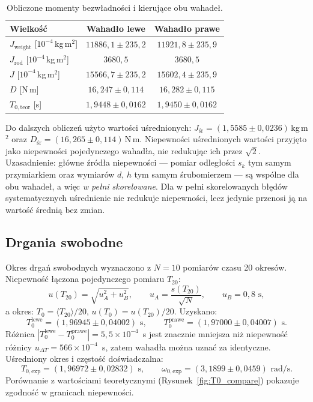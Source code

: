 \documentclass[12pt, a4paper]{article}
\begin{document}
\begin{table}[H]
    \centering
    \caption{Obliczone momenty bezwładności i kierujące obu wahadeł.}\label{tab:JD}
    \begin{tabular}{lcc}
        \toprule
        Wielkość & Wahadło lewe & Wahadło prawe \\
        \midrule
        $J_\text{weight}$ [$10^{-4}$\,kg\,m$^2$]
            & $11886{,}1\pm235{,}2$ & $11921{,}8\pm235{,}9$ \\
        $J_\text{rod}$ [$10^{-4}$\,kg\,m$^2$]
            & $3680{,}5$ & $3680{,}5$ \\
        $J$ [$10^{-4}$\,kg\,m$^2$]
            & $15566{,}7\pm235{,}2$ & $15602{,}4\pm235{,}9$ \\
        $D$ [N\,m]
            & $16{,}247\pm0{,}114$ & $16{,}282\pm0{,}115$ \\
        $T_{0,\text{teor}}$ [s]
            & $1{,}9448\pm0{,}0162$ & $1{,}9450\pm0{,}0162$ \\
        \bottomrule
    \end{tabular}
\end{table}

Do dalszych obliczeń użyto wartości uśrednionych:
$J_\text{śr} = (1{,}5585\pm0{,}0236)$\,kg\,m$^2$
oraz $D_\text{śr} = (16{,}265\pm0{,}114)$\,N\,m.
Niepewności uśrednionych wartości przyjęto jako niepewności pojedynczego wahadła,
nie redukując ich przez $\sqrt{2}$.
Uzasadnienie: główne źródła niepewności --- pomiar odległości $s_k$ tym samym
przymiarkiem oraz wymiarów $d$, $h$ tym samym śrubomierzem --- są wspólne
dla obu wahadeł, a więc \emph{w pełni skorelowane}.
Dla w pełni skorelowanych błędów systematycznych uśrednienie nie redukuje
niepewności, lecz jedynie przenosi ją na wartość średnią bez zmian.

\subsection{Drgania swobodne}

Okres drgań swobodnych wyznaczono z $N=10$ pomiarów czasu 20 okresów.
Niepewność łączona pojedynczego pomiaru $T_{20}$:
\begin{equation}
    u(T_{20}) = \sqrt{u_A^2 + u_B^2},\qquad
    u_A = \frac{s(T_{20})}{\sqrt{N}},\qquad
    u_B = 0{,}8\text{ s},
    \label{eq:uT20}
\end{equation}
a okres: $T_0 = \langle T_{20}\rangle/20$, $u(T_0) = u(T_{20})/20$.
Uzyskano:
\begin{equation}
    T_0^\text{lewe}  = (1{,}96945\pm0{,}04002)\text{ s},\qquad
    T_0^\text{prawe} = (1{,}97000\pm0{,}04007)\text{ s}.
\end{equation}
Różnica $|T_0^\text{lewe} - T_0^\text{prawe}| = 5{,}5\times10^{-4}$~s
jest znacznie mniejsza niż niepewność różnicy $u_{\Delta T} = 566\times10^{-4}$~s,
zatem wahadła można uznać za identyczne.
Uśredniony okres i częstość doświadczalna:
\begin{equation}
    T_{0,\text{exp}} = (1{,}96972\pm0{,}02832)\text{ s},\qquad
    \omega_{0,\text{exp}} = (3{,}1899\pm0{,}0459)\text{ rad/s}.
\end{equation}
Porównanie z wartościami teoretycznymi (Rysunek~\ref{fig:T0_compare})
pokazuje zgodność w granicach niepewności.
\end{document}
